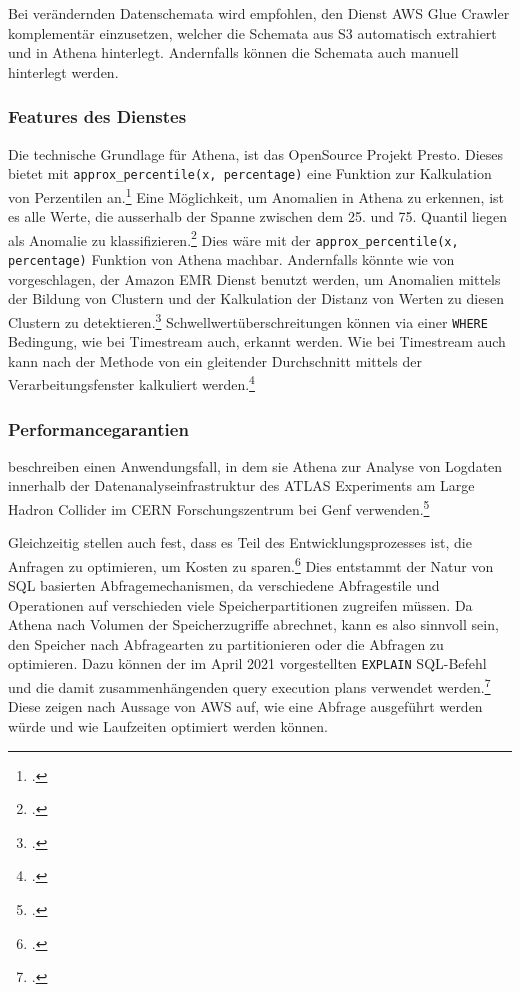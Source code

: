 Bei verändernden Datenschemata wird empfohlen, den Dienst \ac{AWS} Glue Crawler komplementär einzusetzen, welcher die Schemata aus \ac{S3} automatisch extrahiert und in Athena hinterlegt. Andernfalls können die Schemata auch manuell hinterlegt werden.

\subsubsection{Features des Dienstes}
Die technische Grundlage für Athena, ist das OpenSource Projekt Presto. Dieses bietet mit \texttt{approx_percentile(x, percentage)} eine Funktion zur Kalkulation von Perzentilen an.\footcite[Vgl.][]{ThePrestoFoundation.o.J.}
Eine Möglichkeit, um Anomalien in Athena zu erkennen, ist es alle Werte, die ausserhalb der Spanne zwischen dem 25. und 75. Quantil liegen als Anomalie zu klassifizieren.\footcite[Vgl.][]{Salgado.2019} Dies wäre mit der \texttt{approx_percentile(x, percentage)} Funktion von Athena machbar. Andernfalls könnte wie von \citeauthor{Megler.2016} vorgeschlagen, der Amazon \ac{EMR} Dienst benutzt werden, um Anomalien mittels der Bildung von Clustern und der Kalkulation der Distanz von Werten zu diesen Clustern zu detektieren.\footcite[Vgl.][]{Megler.2016}
Schwellwertüberschreitungen können via einer \texttt{WHERE} Bedingung, wie bei Timestream auch, erkannt werden.
Wie bei Timestream auch kann nach der Methode von \citeauthor{Ross.2020} ein gleitender Durchschnitt mittels der Verarbeitungsfenster kalkuliert werden.\footcite[Vgl.][]{Ross.2020}

\subsubsection{Performancegarantien}

\citeauthor{Hartland.2018} beschreiben einen Anwendungsfall, in dem sie Athena zur Analyse von Logdaten innerhalb der Datenanalyseinfrastruktur des ATLAS Experiments am Large Hadron Collider im CERN Forschungszentrum bei Genf verwenden.\footcite[Vgl.][]{Hartland.2018}

Gleichzeitig stellen \citeauthor{Hartland.2018} auch fest, dass es Teil des Entwicklungsprozesses ist, die Anfragen zu  optimieren, um Kosten zu sparen.\footcite[Vgl.][5]{Hartland.2018} Dies entstammt der Natur von \ac{SQL} basierten Abfragemechanismen, da verschiedene Abfragestile und Operationen auf verschieden viele Speicherpartitionen zugreifen müssen. Da Athena nach Volumen der Speicherzugriffe abrechnet, kann es also sinnvoll sein, den Speicher nach Abfragearten zu partitionieren oder die Abfragen zu optimieren. Dazu können der im April 2021 vorgestellten \texttt{EXPLAIN} \ac{SQL}-Befehl und die damit zusammenhängenden query execution plans verwendet werden.\footcite[Vgl. auch im Folgenden][]{AmazonWebServicesInc..2021} Diese zeigen nach Aussage von \ac{AWS} auf, wie eine Abfrage ausgeführt werden würde und wie Laufzeiten optimiert werden können.

